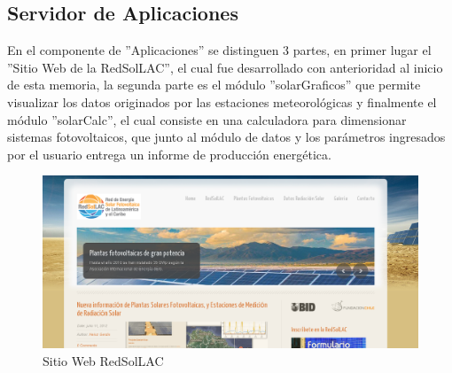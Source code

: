 \subsection{Servidor de Aplicaciones}
En el componente de ''Aplicaciones'' se distinguen 3 partes, en primer lugar el ''Sitio Web de la RedSolLAC'', el cual fue desarrollado con anterioridad al inicio de esta memoria, la segunda parte es el módulo ''solarGraficos'' que permite visualizar los datos originados por las estaciones meteorológicas y finalmente el módulo ''solarCalc'', el cual consiste en una calculadora para dimensionar sistemas fotovoltaicos, que junto al módulo de datos y los parámetros ingresados por el usuario entrega un informe de producción energética.

\begin{figure}[h!]
        \centering
        \includegraphics[scale=0.3]{images/webRedSolLAC}
        \caption{Sitio Web RedSolLAC}
        \label{webRed}
\end{figure}

